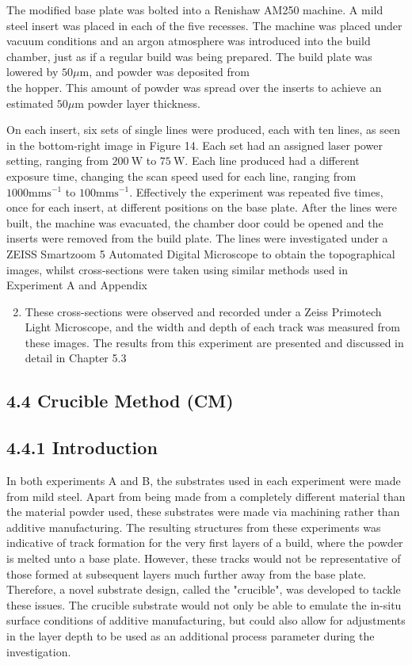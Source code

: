 \documentclass[10pt]{article}
\begin{document}
The modified base plate was bolted into a Renishaw AM250 machine. A mild steel insert was placed in each of the five recesses. The machine was placed under vacuum conditions and an argon atmosphere was introduced into the build chamber, just as if a regular build was being prepared. The build plate was lowered by $50 \mu \mathrm{m}$, and powder was deposited from\\
the hopper. This amount of powder was spread over the inserts to achieve an estimated $50 \mu \mathrm{m}$ powder layer thickness.

On each insert, six sets of single lines were produced, each with ten lines, as seen in the bottom-right image in Figure 14. Each set had an assigned laser power setting, ranging from $200 \mathrm{~W}$ to $75 \mathrm{~W}$. Each line produced had a different exposure time, changing the scan speed used for each line, ranging from $1000 \mathrm{mms}^{-1}$ to $100 \mathrm{mms}^{-1}$. Effectively the experiment was repeated five times, once for each insert, at different positions on the base plate. After the lines were built, the machine was evacuated, the chamber door could be opened and the inserts were removed from the build plate. The lines were investigated under a ZEISS Smartzoom 5 Automated Digital Microscope to obtain the topographical images, whilst cross-sections were taken using similar methods used in Experiment A and Appendix

\begin{enumerate}
  \setcounter{enumi}{1}
  \item These cross-sections were observed and recorded under a Zeiss Primotech Light Microscope, and the width and depth of each track was measured from these images. The results from this experiment are presented and discussed in detail in Chapter 5.3
\end{enumerate}

\subsection*{4.4 Crucible Method (CM)}
\subsection*{4.4.1 Introduction}
In both experiments A and B, the substrates used in each experiment were made from mild steel. Apart from being made from a completely different material than the material powder used, these substrates were made via machining rather than additive manufacturing. The resulting structures from these experiments was indicative of track formation for the very first layers of a build, where the powder is melted unto a base plate. However, these tracks would not be representative of those formed at subsequent layers much further away from the base plate. Therefore, a novel substrate design, called the "crucible", was developed to tackle these issues. The crucible substrate would not only be able to emulate the in-situ surface conditions of additive manufacturing, but could also allow for adjustments in the layer depth to be used as an additional process parameter during the investigation.
\end{document}
